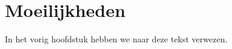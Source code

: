\chapter{Moeilijkheden}
In het vorig hoofdstuk hebben we naar deze tekst verwezen\label{verwijzing}.
